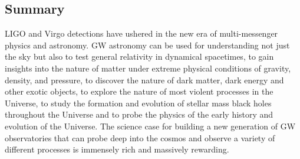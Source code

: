 \documentclass[twocolumn,aps,prd,nofootinbib,superscriptaddress,10pt,notitlepage,preprintnumbers] {revtex4-1}
\begin{document}
\subsection*{Summary}
LIGO and Virgo detections have ushered in the new era of multi-messenger physics and astronomy.  GW astronomy can be used for understanding not just the sky but also to test general relativity in dynamical spacetimes, to gain insights into the nature of matter under extreme physical conditions of gravity, density, and pressure, to discover the nature of dark matter, dark energy and other exotic objects, to explore the nature of most violent processes in the Universe, to study the formation and evolution of stellar mass black holes throughout the Universe and to probe the physics of the early history and evolution of the Universe. The science case for building a new generation of GW observatories that can probe deep into the cosmos and observe a variety of different processes is immensely rich and massively rewarding. 




\end{document}
